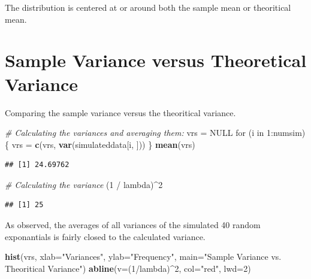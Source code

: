 \documentclass[]{article}
\newenvironment{Shaded}{\begin{snugshade}}{\end{snugshade}}
\newcommand{\KeywordTok}[1]{\textcolor[rgb]{0.13,0.29,0.53}{\textbf{{#1}}}}
\newcommand{\DataTypeTok}[1]{\textcolor[rgb]{0.13,0.29,0.53}{{#1}}}
\newcommand{\DecValTok}[1]{\textcolor[rgb]{0.00,0.00,0.81}{{#1}}}
\newcommand{\StringTok}[1]{\textcolor[rgb]{0.31,0.60,0.02}{{#1}}}
\newcommand{\CommentTok}[1]{\textcolor[rgb]{0.56,0.35,0.01}{\textit{{#1}}}}
\newcommand{\OtherTok}[1]{\textcolor[rgb]{0.56,0.35,0.01}{{#1}}}
\newcommand{\NormalTok}[1]{{#1}}
\begin{document}
The distribution is centered at or around both the sample mean or
theoritical mean.

\section{Sample Variance versus Theoretical
Variance}\label{sample-variance-versus-theoretical-variance}

Comparing the sample variance versus the theoritical variance.

\begin{Shaded}
\begin{Highlighting}[]
\CommentTok{# Calculating the variances and averaging them:}
\NormalTok{vrs =}\StringTok{ }\OtherTok{NULL}
\NormalTok{for (i in }\DecValTok{1}\NormalTok{:numsim) \{}
  \NormalTok{vrs =}\StringTok{ }\KeywordTok{c}\NormalTok{(vrs, }\KeywordTok{var}\NormalTok{(simulateddata[i, ]))}
\NormalTok{\}}
\KeywordTok{mean}\NormalTok{(vrs)}
\end{Highlighting}
\end{Shaded}

\begin{verbatim}
## [1] 24.69762
\end{verbatim}

\begin{Shaded}
\begin{Highlighting}[]
\CommentTok{# Calculating the variance}
\NormalTok{(}\DecValTok{1} \NormalTok{/}\StringTok{ }\NormalTok{lambda)^}\DecValTok{2}
\end{Highlighting}
\end{Shaded}

\begin{verbatim}
## [1] 25
\end{verbatim}

As observed, the averages of all variances of the simulated 40 random
exponantials is fairly closed to the calculated variance.

\begin{Shaded}
\begin{Highlighting}[]
\KeywordTok{hist}\NormalTok{(vrs, }\DataTypeTok{xlab=}\StringTok{"Variances"}\NormalTok{, }\DataTypeTok{ylab=}\StringTok{"Frequency"}\NormalTok{, }\DataTypeTok{main=}\StringTok{"Sample Variance vs. Theoritical Variance"}\NormalTok{)}
\KeywordTok{abline}\NormalTok{(}\DataTypeTok{v=}\NormalTok{(}\DecValTok{1}\NormalTok{/lambda)^}\DecValTok{2}\NormalTok{, }\DataTypeTok{col=}\StringTok{"red"}\NormalTok{, }\DataTypeTok{lwd=}\DecValTok{2}\NormalTok{)}
\end{Highlighting}
\end{Shaded}
\end{document}
